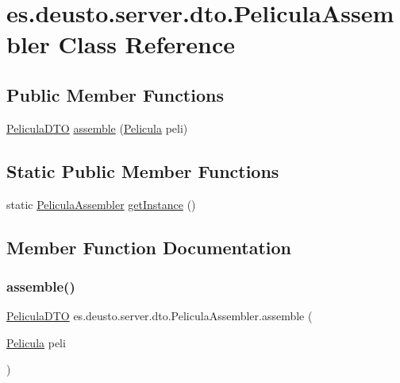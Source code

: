 \hypertarget{classes_1_1deusto_1_1server_1_1dto_1_1_pelicula_assembler}{}\section{es.\+deusto.\+server.\+dto.\+Pelicula\+Assembler Class Reference}
\label{classes_1_1deusto_1_1server_1_1dto_1_1_pelicula_assembler}
\subsection*{Public Member Functions}
\begin{DoxyCompactItemize}
\item 
\mbox{\hyperlink{classes_1_1deusto_1_1server_1_1dto_1_1_pelicula_d_t_o}{Pelicula\+D\+TO}} \mbox{\hyperlink{classes_1_1deusto_1_1server_1_1dto_1_1_pelicula_assembler_aabdb7cc7d778e515c72925693160b3b4}{assemble}} (\mbox{\hyperlink{classes_1_1deusto_1_1client_1_1data_1_1_pelicula}{Pelicula}} peli)
\end{DoxyCompactItemize}
\subsection*{Static Public Member Functions}
\begin{DoxyCompactItemize}
\item 
static \mbox{\hyperlink{classes_1_1deusto_1_1server_1_1dto_1_1_pelicula_assembler}{Pelicula\+Assembler}} \mbox{\hyperlink{classes_1_1deusto_1_1server_1_1dto_1_1_pelicula_assembler_a2be8d853cb1714eb6c35b4e2fd0ff565}{get\+Instance}} ()
\end{DoxyCompactItemize}


\subsection{Member Function Documentation}
\mbox{\label{classes_1_1deusto_1_1server_1_1dto_1_1_pelicula_assembler_aabdb7cc7d778e515c72925693160b3b4}} 
\subsubsection{\texorpdfstring{assemble()}{assemble()}}
{\footnotesize\ttfamily \mbox{\hyperlink{classes_1_1deusto_1_1server_1_1dto_1_1_pelicula_d_t_o}{Pelicula\+D\+TO}} es.\+deusto.\+server.\+dto.\+Pelicula\+Assembler.\+assemble (\begin{DoxyParamCaption}\item[{\mbox{\hyperlink{classes_1_1deusto_1_1client_1_1data_1_1_pelicula}{Pelicula}}}]{peli }\end{DoxyParamCaption})}

